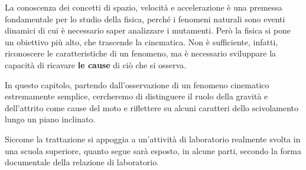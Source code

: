 La conoscenza dei concetti di spazio, velocità e accelerazione è una premessa fondamentale per lo studio della fisica, perché i fenomeni naturali sono eventi dinamici di cui è necessario saper analizzare i mutamenti.\newline
Però la fisica si pone un obiettivo più alto, che trascende la cinematica. Non è sufficiente, infatti, riconoscere le caratteristiche di un fenomeno, ma è necessario sviluppare la capacità di ricavare {\bf le cause} di ciò che si osserva.\newline

In questo capitolo, partendo dall'osservazione di un fenomeno cinematico estremamente semplice, cercheremo di distinguere il ruolo della gravità e dell'attrito come cause del moto e riflettere su alcuni caratteri dello scivolamento lungo un piano inclinato.\newline

Siccome la trattazione si appoggia a un'attività di laboratorio realmente svolta in una scuola superiore, quanto segue sarà esposto, in alcune parti, secondo la forma documentale della relazione di laboratorio.
